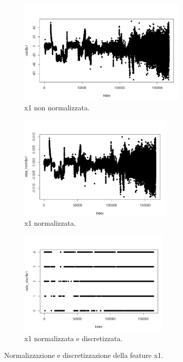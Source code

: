 \documentclass[12pt]{article}
\begin{document}
\begin{figure}[h]	
	\begin{subfigure}{0.5\textwidth}
		\includegraphics[width=0.9\linewidth, height=5cm]{images/x1notnormalize.PNG} 
		\caption{x1 non normalizzata.}
		\label{fig:x1nonNormalize}
	\end{subfigure}
	\begin{subfigure}{0.5\textwidth}
		\includegraphics[width=0.9\linewidth, height=5cm]{images/x1normalize.PNG}
		\caption{x1 normalizzata.}
		\label{fig:subim2}
	\end{subfigure}
	\begin{subfigure}{0.5\textwidth}
		\includegraphics[width=0.9\linewidth, height=5cm]{images/x1discretize.PNG}
		\caption{x1 normalizzata e discretizzata.}
		\label{fig:subim2}
	\end{subfigure}
	\caption{Normalizzazione e discretizzazione della feature x1.}
	\label{x1}
\end{figure}
\end{document}
